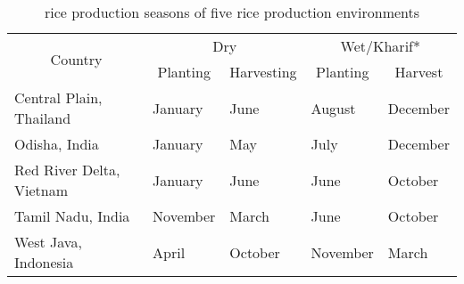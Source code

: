 \begin{table}
\centering
\caption{rice production seasons of five rice production environments}
\label{table:riceproduction_season}
\begin{tabular}{lllll}
\hline
\multicolumn{1}{c}{\multirow{2}{*}{Country}} & \multicolumn{2}{c}{Dry}                                       & \multicolumn{2}{c}{Wet/Kharif*}                            \\
\cline{2-5}
\multicolumn{1}{c}{}                         & \multicolumn{1}{c}{Planting} & \multicolumn{1}{c}{Harvesting} & \multicolumn{1}{c}{Planting} & \multicolumn{1}{c}{Harvest} \\
\hline
Central Plain, Thailand                                     & January                      & June                           & August                       & December                    \\
Odisha, India                                        & January                     & May                            & July                          & December                     \\
Red River Delta, Vietnam                                      & January                     & June                          & June                        & October      \\
Tamil Nadu, India                                        & November                     & March                            & June                          & October                     \\
West Java, Indonesia                                    & April                        & October                        & November                     & March                       \\
\hline               
\end{tabular}
\end{table}